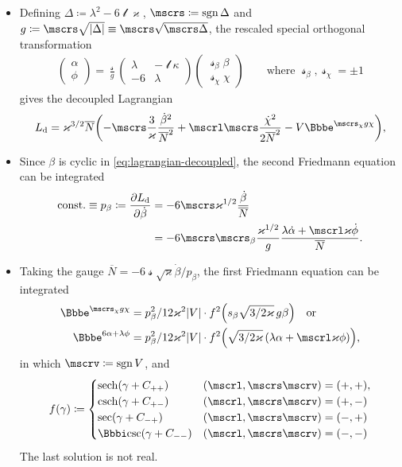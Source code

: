 \documentclass[9pt]{beamer}
\begin{document}
\begin{itemize}
\item Defining $\Delta \coloneqq \lambda^2 - 6\mscrl\varkappa$,
$\mscrs \coloneqq \sgn \Delta$ and
$g \coloneqq \mscrs \sqrt{\vbr{\Delta}} \equiv \mscrs\sqrt{\mscrs\Delta}$,
the rescaled special orthogonal transformation
\begin{align}
\begin{pmatrix}
\alpha \\ \phi
\end{pmatrix} = \frac{\mscrs}{g}
\begin{pmatrix}
\lambda & -\mscrl\kappa \\
-6 & \lambda
\end{pmatrix}
\begin{pmatrix}
\mscrs_\beta \beta \\ \mscrs_\chi \chi
\end{pmatrix}\qquad\text{where } \mscrs_\beta, \mscrs_\chi = \pm 1
\end{align}
gives the decoupled Lagrangian
\begin{align}
L_\text{d} = \varkappa^{3/2}\overline{N}
\rbr{-\mscrs\frac{3}{\varkappa}\frac{\dot{\beta}^2}{\overline{N}^2}
+\mscrl\mscrs\frac{\dot{\chi}^2}{2\overline{N}^2}
-V\ee^{\mscrs_\chi g\chi}},
\label{eq:lagrangian-decoupled}
\end{align}

\item Since $\beta$ is cyclic in \cref{eq:lagrangian-decoupled},
the second Friedmann equation can be integrated
\begin{align}
\text{const.} \equiv p_\beta \coloneqq \frpa{L_\text{d}}{\dot{\beta}} &=
-6\mscrs\varkappa^{1/2}\frac{\dot{\beta}}{\overline{N}} \\
&=
-6\mscrs\mscrs_\beta\frac{\varkappa^{1/2}}{g}
\frac{\lambda\dot{\alpha}+\mscrl\varkappa\dot{\phi}}{\overline{N}}.
\end{align}

\item Taking the gauge $\overline{N} = -6\mscrs\sqrt{\varkappa}\dot{\beta}/p_\beta$, the first Friedmann equation can be integrated
\begin{align}
\ee^{\mscrs_\chi g\chi} &= p_\beta^2/12\varkappa^2\vbr{V}\cdot
\rfun{f^2}{s_\beta \sqrt{3/2\varkappa}\,g \beta}
\quad\text{or}\\
\ee^{6\alpha+\lambda\phi} &= p_\beta^2/12\varkappa^2\vbr{V}\cdot
\rfun{f^2}{\sqrt{3/2\varkappa}\,\rbr{\lambda\alpha+\mscrl\varkappa\phi}},
\end{align}
in which $\mscrv \coloneqq \sgn V$, and
\begin{align}
\rfun{f}{\gamma} \coloneqq
\begin{cases}
\rfun{\sech}{\gamma+C_{++}} & \rbr{\mscrl, \mscrs\mscrv} = \rbr{+,+}, \\
\rfun{\csch}{\gamma+C_{+-}} & \rbr{\mscrl, \mscrs\mscrv} = \rbr{+,-} \\
\rfun{\sec}{\gamma+C_{-+}} & \rbr{\mscrl, \mscrs\mscrv} = \rbr{-,+} \\
\ii\rfun{\csc}{\gamma+C_{--}} & \rbr{\mscrl, \mscrs\mscrv} = \rbr{-,-} \\
\end{cases}
\end{align}
The last solution is not real.


\end{itemize}
\end{document}
